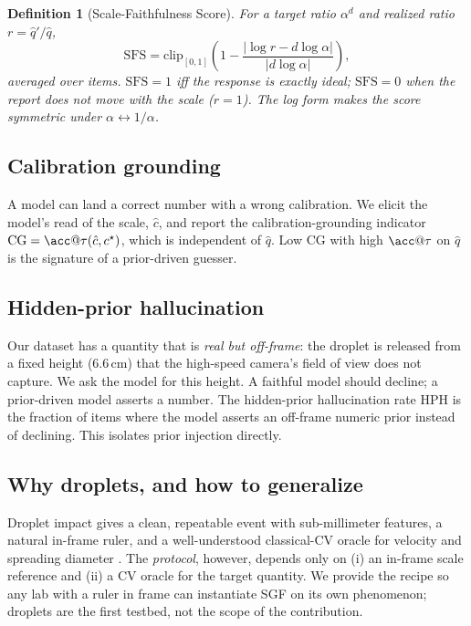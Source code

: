 \documentclass[11pt]{article}
\newtheorem{definition}{Definition}
\newcommand{\sfs}{\mathrm{SFS}}
\newcommand{\cg}{\mathrm{CG}}
\newcommand{\hph}{\mathrm{HPH}}
\begin{document}
\begin{definition}[Scale-Faithfulness Score]
For a target ratio $\alpha^{d}$ and realized ratio $r = \hat q'/\hat q$,
\[
\sfs = \mathrm{clip}_{[0,1]}\!\left(1 - \frac{\big|\log r - d\log\alpha\big|}
{\big|d\log\alpha\big|}\right),
\]
averaged over items. $\sfs=1$ iff the response is exactly ideal; $\sfs=0$ when
the report does not move with the scale ($r=1$). The log form makes the score
symmetric under $\alpha \leftrightarrow 1/\alpha$.
\end{definition}

\subsection{Calibration grounding}
A model can land a correct number with a wrong calibration. We elicit the model's
read of the scale, $\hat c$, and report the calibration-grounding indicator
$\cg = \acc@\tau(\hat c, c^\star)$, which is independent of $\hat q$. Low $\cg$
with high $\acc@\tau$ on $\hat q$ is the signature of a prior-driven guesser.

\subsection{Hidden-prior hallucination}
Our dataset has a quantity that is \emph{real but off-frame}: the droplet is
released from a fixed height (6.6\,cm) that the high-speed camera's field of view
does not capture. We ask the model for this height. A faithful model should
decline; a prior-driven model asserts a number. The hidden-prior hallucination
rate $\hph$ is the fraction of items where the model asserts an off-frame numeric
prior instead of declining. This isolates prior injection directly.

\subsection{Why droplets, and how to generalize}
Droplet impact gives a clean, repeatable event with sub-millimeter features, a
natural in-frame ruler, and a well-understood classical-CV oracle for velocity
and spreading diameter \citep{rioboo2001spreading,josserand2016drop}. The
\emph{protocol}, however, depends only on (i) an in-frame scale reference and
(ii) a CV oracle for the target quantity. We provide the recipe so any lab with a
ruler in frame can instantiate SGF on its own phenomenon; droplets are the first
testbed, not the scope of the contribution.
\end{document}
